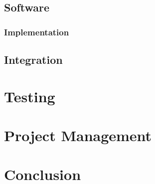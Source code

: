 \subsection{Software}

\subsubsection{Implementation}

\subsection{Integration}

\section{Testing}

\section{Project Management}

\section{Conclusion}


